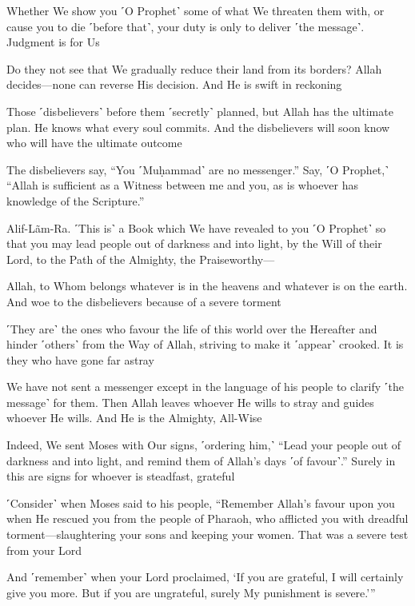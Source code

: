Whether We show you ˹O Prophet˺ some of what We threaten them with, or cause you to die ˹before that˺, your duty is only to deliver ˹the message˺. Judgment is for Us

Do they not see that We gradually reduce their land from its borders? Allah decides—none can reverse His decision. And He is swift in reckoning

Those ˹disbelievers˺ before them ˹secretly˺ planned, but Allah has the ultimate plan. He knows what every soul commits. And the disbelievers will soon know who will have the ultimate outcome

The disbelievers say, “You ˹Muḥammad˺ are no messenger.” Say, ˹O Prophet,˺ “Allah is sufficient as a Witness between me and you, as is whoever has knowledge of the Scripture.”

Alif-Lãm-Ra. ˹This is˺ a Book which We have revealed to you ˹O Prophet˺ so that you may lead people out of darkness and into light, by the Will of their Lord, to the Path of the Almighty, the Praiseworthy—

Allah, to Whom belongs whatever is in the heavens and whatever is on the earth. And woe to the disbelievers because of a severe torment

˹They are˺ the ones who favour the life of this world over the Hereafter and hinder ˹others˺ from the Way of Allah, striving to make it ˹appear˺ crooked. It is they who have gone far astray

We have not sent a messenger except in the language of his people to clarify ˹the message˺ for them. Then Allah leaves whoever He wills to stray and guides whoever He wills. And He is the Almighty, All-Wise

Indeed, We sent Moses with Our signs, ˹ordering him,˺ “Lead your people out of darkness and into light, and remind them of Allah’s days ˹of favour˺.” Surely in this are signs for whoever is steadfast, grateful

˹Consider˺ when Moses said to his people, “Remember Allah’s favour upon you when He rescued you from the people of Pharaoh, who afflicted you with dreadful torment—slaughtering your sons and keeping your women. That was a severe test from your Lord

And ˹remember˺ when your Lord proclaimed, ‘If you are grateful, I will certainly give you more. But if you are ungrateful, surely My punishment is severe.’”

